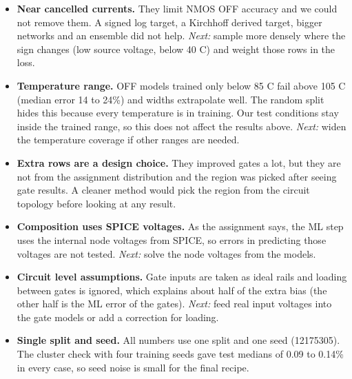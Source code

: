 \documentclass[10pt,a4paper]{article}
\begin{document}
\begin{itemize}
\item \textbf{Near cancelled currents.} They limit NMOS OFF accuracy and we could not remove them. A signed log target, a Kirchhoff derived target, bigger networks and an ensemble did not help. \textit{Next:} sample more densely where the sign changes (low source voltage, below 40 \textdegree C) and weight those rows in the loss.
\item \textbf{Temperature range.} OFF models trained only below 85 \textdegree C fail above 105 \textdegree C (median error 14 to 24\%) and widths extrapolate well. The random split hides this because every temperature is in training. Our test conditions stay inside the trained range, so this does not affect the results above. \textit{Next:} widen the temperature coverage if other ranges are needed.
\item \textbf{Extra rows are a design choice.} They improved gates a lot, but they are not from the assignment distribution and the region was picked after seeing gate results. A cleaner method would pick the region from the circuit topology before looking at any result.
\item \textbf{Composition uses SPICE voltages.} As the assignment says, the ML step uses the internal node voltages from SPICE, so errors in predicting those voltages are not tested. \textit{Next:} solve the node voltages from the models.
\item \textbf{Circuit level assumptions.} Gate inputs are taken as ideal rails and loading between gates is ignored, which explains about half of the extra bias (the other half is the ML error of the gates). \textit{Next:} feed real input voltages into the gate models or add a correction for loading.
\item \textbf{Single split and seed.} All numbers use one split and one seed (12175305). The cluster check with four training seeds gave test medians of 0.09 to 0.14\% in every case, so seed noise is small for the final recipe.
\end{itemize}
\end{document}
